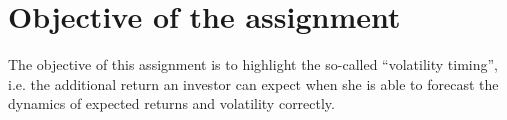 \chapter{Objective of the assignment}
The objective of this assignment is to highlight the so-called “volatility timing”, i.e. the additional return an investor can expect when she is able to forecast the dynamics of expected returns and volatility correctly. 